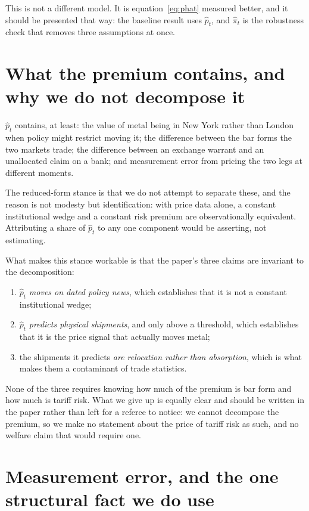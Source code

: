 \documentclass[11pt,a4paper]{article}
\newcommand{\phat}{\widehat{p}_t}
\begin{document}
This is not a different model. It is equation~\eqref{eq:phat} measured better,
and it should be presented that way: the baseline result uses $\phat$, and
$\widehat{\pi}_t$ is the robustness check that removes three assumptions at
once.

\section{What the premium contains, and why we do not decompose it}
\label{sec:contains}

$\phat$ contains, at least: the value of metal being in New York rather than
London when policy might restrict moving it; the difference between the bar
forms the two markets trade; the difference between an exchange warrant and an
unallocated claim on a bank; and measurement error from pricing the two legs at
different moments.

The reduced-form stance is that we do not attempt to separate these, and the
reason is not modesty but identification: with price data alone, a constant
institutional wedge and a constant risk premium are observationally
equivalent. Attributing a share of $\phat$ to any one component would be
asserting, not estimating.

What makes this stance workable is that the paper's three claims are invariant
to the decomposition:

\begin{enumerate}[leftmargin=1.4em,itemsep=2pt,topsep=2pt]
\item $\phat$ \emph{moves on dated policy news}, which establishes that it is
not a constant institutional wedge;
\item $\phat$ \emph{predicts physical shipments}, and only above a threshold,
which establishes that it is the price signal that actually moves metal;
\item the shipments it predicts \emph{are relocation rather than absorption},
which is what makes them a contaminant of trade statistics.
\end{enumerate}

None of the three requires knowing how much of the premium is bar form and how
much is tariff risk. What we give up is equally clear and should be written in
the paper rather than left for a referee to notice: we cannot decompose the
premium, so we make no statement about the price of tariff risk as such, and no
welfare claim that would require one.

\section{Measurement error, and the one structural fact we do use}
\label{sec:timing}
\end{document}
